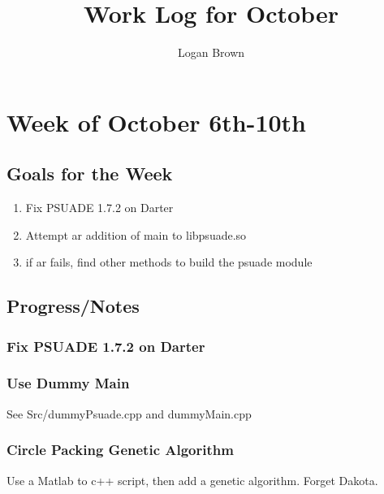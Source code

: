 

\title{Work Log for October}
\author{Logan Brown}


\maketitle


\setcounter{section}{0} %
\setcounter{subsection}{-1}
\setcounter{subsubsection}{0}

\section{Week of October 6th-10th}
\subsection{Goals for the Week}
\begin{enumerate}
	\item Fix PSUADE 1.7.2 on Darter
	\item Attempt ar addition of main to libpsuade.so
	\item if ar fails, find other methods to build the psuade module

\end{enumerate}

\subsection{Progress/Notes}

\subsubsection{Fix PSUADE 1.7.2 on Darter}

\subsubsection{Use Dummy Main}

See Src/dummyPsuade.cpp and dummyMain.cpp

\subsubsection{Circle Packing Genetic Algorithm}

Use a Matlab to c++ script, then add a genetic algorithm. Forget Dakota.

